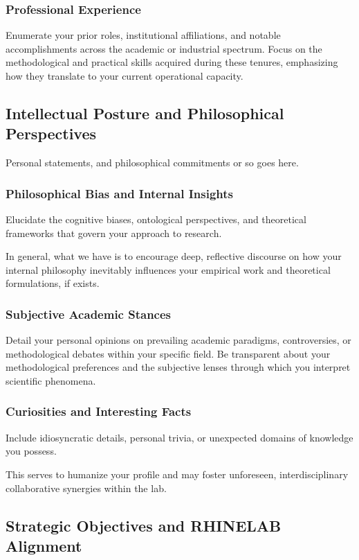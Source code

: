 \documentclass[10pt,a4paper]{article}
\begin{document}
\subsubsection{Professional Experience}
Enumerate your prior roles, institutional affiliations, and notable accomplishments across the academic or industrial spectrum. Focus on the methodological and practical skills acquired during these tenures, emphasizing how they translate to your current operational capacity.

\subsection{Intellectual Posture and Philosophical Perspectives}

Personal statements, and philosophical commitments or so goes here. 

\subsubsection{Philosophical Bias and Internal Insights}
Elucidate the cognitive biases, ontological perspectives, and theoretical frameworks that govern your approach to research. 

In general, what we have is to encourage deep, reflective discourse on how your internal philosophy inevitably influences your empirical work and theoretical formulations, if exists.

\subsubsection{Subjective Academic Stances}
Detail your personal opinions on prevailing academic paradigms, controversies, or methodological debates within your specific field. Be transparent about your methodological preferences and the subjective lenses through which you interpret scientific phenomena.

\subsubsection{Curiosities and Interesting Facts}
Include idiosyncratic details, personal trivia, or unexpected domains of knowledge you possess. 

This serves to humanize your profile and may foster unforeseen, interdisciplinary collaborative synergies within the lab.

\subsection{Strategic Objectives and RHINELAB Alignment}
\end{document}
